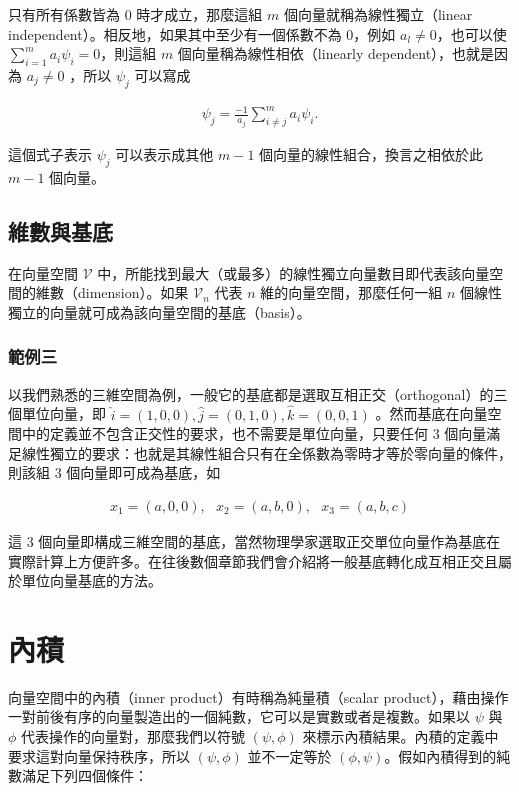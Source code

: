 只有所有係數皆為 0 時才成立，那麼這組 $ m $ 個向量就稱為線性獨立（linear independent）。相反地，如果其中至少有一個係數不為 0，例如 $ a_l \neq 0$，也可以使 $ \sum_{i=1}^ma_i\psi_i=\mathit{0} $，則這組 $ m $ 個向量稱為線性相依（linearly dependent），也就是因為 $a_j\neq 0$ ，所以 $\psi_j$ 可以寫成

\begin{align*}
\psi_j=\frac{-1}{a_j}\sum_{i\neq j}^m a_i\psi_i.
\end{align*}

這個式子表示 $\psi_j$ 可以表示成其他 $m-1$ 個向量的線性組合，換言之相依於此 $m-1$ 個向量。

\subsection{維數與基底}

在向量空間 $ \mathcal{V} $ 中，所能找到最大（或最多）的線性獨立向量數目即代表該向量空間的維數（dimension）。如果 $ \mathcal{V}_n $ 代表 $n$ 維的向量空間，那麼任何一組 $n$ 個線性獨立的向量就可成為該向量空間的基底（basis）。

\subsubsection*{範例三}

以我們熟悉的三維空間為例，一般它的基底都是選取互相正交（orthogonal）的三個單位向量，即 $\hat{i}=(1,0,0), \hat{j}=(0,1,0), \hat{k}=(0,0,1)$ 。然而基底在向量空間中的定義並不包含正交性的要求，也不需要是單位向量，只要任何 3 個向量滿足線性獨立的要求：也就是其線性組合只有在全係數為零時才等於零向量的條件，則該組 3 個向量即可成為基底，如

\begin{align*}
x_1=(a,0,0),~~~x_2=(a,b,0),~~~x_3=(a,b,c)
\end{align*}

這 3 個向量即構成三維空間的基底，當然物理學家選取正交單位向量作為基底在實際計算上方便許多。在往後數個章節我們會介紹將一般基底轉化成互相正交且屬於單位向量基底的方法。


\section{內積}

向量空間中的內積（inner product）有時稱為純量積（scalar product），藉由操作一對前後有序的向量製造出的一個純數，它可以是實數或者是複數。如果以 $ \psi $ 與 $ \phi $ 代表操作的向量對，那麼我們以符號 $ (\psi,\phi) $ 來標示內積結果。內積的定義中要求這對向量保持秩序，所以 $ (\psi,\phi) $ 並不一定等於 $ (\phi,\psi) $。假如內積得到的純數滿足下列四個條件：

